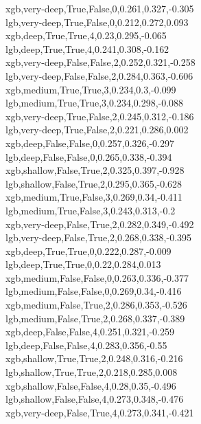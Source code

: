 xgb,very-deep,True,False,0,0.261,0.327,-0.305 \\
lgb,very-deep,True,False,0,0.212,0.272,0.093 \\
xgb,deep,True,True,4,0.23,0.295,-0.065 \\
lgb,deep,True,True,4,0.241,0.308,-0.162 \\
xgb,very-deep,False,False,2,0.252,0.321,-0.258 \\
lgb,very-deep,False,False,2,0.284,0.363,-0.606 \\
xgb,medium,True,True,3,0.234,0.3,-0.099 \\
lgb,medium,True,True,3,0.234,0.298,-0.088 \\
xgb,very-deep,True,False,2,0.245,0.312,-0.186 \\
lgb,very-deep,True,False,2,0.221,0.286,0.002 \\
xgb,deep,False,False,0,0.257,0.326,-0.297 \\
lgb,deep,False,False,0,0.265,0.338,-0.394 \\
xgb,shallow,False,True,2,0.325,0.397,-0.928 \\
lgb,shallow,False,True,2,0.295,0.365,-0.628 \\
xgb,medium,True,False,3,0.269,0.34,-0.411 \\
lgb,medium,True,False,3,0.243,0.313,-0.2 \\
xgb,very-deep,False,True,2,0.282,0.349,-0.492 \\
lgb,very-deep,False,True,2,0.268,0.338,-0.395 \\
xgb,deep,True,True,0,0.222,0.287,-0.009 \\
lgb,deep,True,True,0,0.22,0.284,0.013 \\
xgb,medium,False,False,0,0.263,0.336,-0.377 \\
lgb,medium,False,False,0,0.269,0.34,-0.416 \\
xgb,medium,False,True,2,0.286,0.353,-0.526 \\
lgb,medium,False,True,2,0.268,0.337,-0.389 \\
xgb,deep,False,False,4,0.251,0.321,-0.259 \\
lgb,deep,False,False,4,0.283,0.356,-0.55 \\
xgb,shallow,True,True,2,0.248,0.316,-0.216 \\
lgb,shallow,True,True,2,0.218,0.285,0.008 \\
xgb,shallow,False,False,4,0.28,0.35,-0.496 \\
lgb,shallow,False,False,4,0.273,0.348,-0.476 \\
xgb,very-deep,False,True,4,0.273,0.341,-0.421 \\
